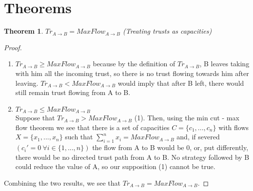 \documentclass[11pt]{article}
\newtheorem{theorem}{Theorem}[section]
\theoremstyle{definition}
\theoremstyle{corollary}
\begin{document}
  \section{Theorems}
    \begin{theorem}
    $Tr_{A \rightarrow B} = MaxFlow_{A \rightarrow B}$ (Treating trusts as capacities)
    \end{theorem}
    \begin{proof} \ 
        \begin{enumerate}
           \item $Tr_{A \rightarrow B} \geq MaxFlow_{A \rightarrow B}$ because by the definition of $Tr_{A \rightarrow B}$,
           B leaves taking with him all the incoming trust, so there is no trust flowing towards him after leaving.
           $Tr_{A \rightarrow B} < MaxFlow_{A \rightarrow B}$ would imply that after B left, there would still remain trust
           flowing from A to B.
           \item $Tr_{A \rightarrow B} \leq MaxFlow_{A \rightarrow B}$ \\
           Suppose that $Tr_{A \rightarrow B} > MaxFlow_{A \rightarrow B}$ (1). Then, using the min cut - max flow theorem we
           see that there is a set of capacities $C= \{c_1,...,c_n\}$ with flows $X = \{x_1,...,x_n\}$ such that
           $\sum_{i=1}^{n}{x_i} = MaxFlow_{A \rightarrow B}$ and, if severed $(c_i' = 0\:\forall i \in \{1,...,n\})$ the flow
           from A to B would be $0$, or, put differently, there would be no directed trust path from A to B. No strategy
           followed by B could reduce the value of A, so our supposition (1) cannot be true.
        \end{enumerate}
        Combining the two results, we see that $Tr_{A \rightarrow B} = MaxFlow_{A \rightarrow B}$.
    \end{proof}
\end{document}
